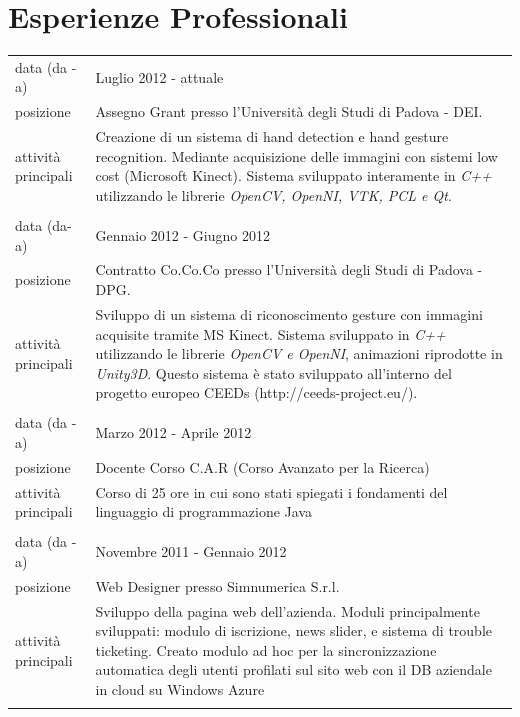 \documentclass[pdftex,a4paper,10pt,twoside,titlepage,italian]{article}
\begin{document}
\section*{Esperienze Professionali}
\begin{tabular}[h]{l p{}}
\footnotesize{data (da - a)} & Luglio 2012 - attuale \\
\footnotesize{posizione} & Assegno Grant presso l'Università degli Studi di Padova - DEI.\\
\footnotesize{attività principali}& Creazione di un sistema di hand detection e hand gesture recognition.
Mediante acquisizione delle immagini con sistemi low cost (Microsoft Kinect). Sistema sviluppato interamente in 
\textit{C++} utilizzando le librerie \textit{OpenCV, OpenNI, VTK, PCL e Qt}.\\
 & \\
\footnotesize{data (da-a)} & Gennaio 2012 - Giugno 2012 \\
\footnotesize{posizione}& Contratto Co.Co.Co presso  l'Università degli Studi di Padova - DPG.\\
\footnotesize{attività principali} & Sviluppo di un sistema di riconoscimento gesture con immagini 
acquisite tramite MS Kinect. Sistema sviluppato 
 			in \textit{C++} utilizzando le librerie \textit{OpenCV e OpenNI}, animazioni riprodotte in \textit{Unity3D}. 
Questo sistema è stato sviluppato all'interno del progetto europeo CEEDs (http://ceeds-project.eu/).\\
& \\
\footnotesize{data (da - a)} & Marzo 2012 - Aprile 2012\\
\footnotesize{posizione} & Docente Corso C.A.R (Corso Avanzato per la Ricerca)\\
\footnotesize{attività principali} & Corso di 25 ore in cui sono stati spiegati i fondamenti del linguaggio di programmazione Java\\
& \\
\footnotesize{data (da - a)} & Novembre 2011 - Gennaio 2012 \\
\footnotesize{posizione} & Web Designer presso Simnumerica S.r.l.\\
\footnotesize{attività principali}& Sviluppo della pagina web dell'azienda. Moduli principalmente sviluppati: modulo di 
		iscrizione, news slider, e sistema di trouble ticketing. Creato modulo ad hoc per la sincronizzazione automatica degli
		utenti profilati sul sito web con il DB aziendale in cloud su Windows Azure\\
		& \\

\end{tabular}
\end{document}

